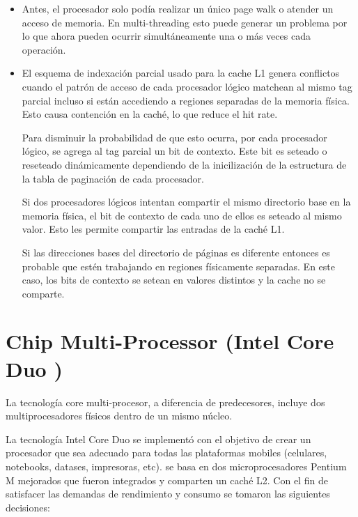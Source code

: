 \begin{itemize}
	\item Antes, el procesador solo podía realizar un único page walk o atender un acceso de memoria. En multi-threading esto puede generar un problema por lo que ahora pueden ocurrir simultáneamente una o más veces cada operación.
	\item El esquema de indexación parcial usado para la cache L1 genera conflictos cuando el patrón de acceso de cada procesador lógico matchean al mismo tag parcial incluso si están accediendo a regiones separadas de la memoria física. Esto causa contención en la caché, lo que reduce el hit rate.
	
	Para disminuir la probabilidad de que esto ocurra, por cada procesador lógico, se agrega al tag parcial un bit de contexto. Este bit es seteado o reseteado dinámicamente dependiendo de la inicilización de la estructura de la tabla de paginación de cada procesador. 
	
	Si dos procesadores lógicos intentan compartir el mismo directorio base en la memoria física, el bit de contexto de cada uno de ellos es seteado al mismo valor. Esto les permite compartir las entradas de la caché L1.
	
	Si las direcciones bases del directorio de páginas es diferente entonces es probable que estén trabajando en regiones físicamente separadas. En este caso, los bits de contexto se setean en valores distintos y la cache no se comparte.
\end{itemize}

\newpage
\section{Chip Multi-Processor (Intel Core Duo \cite{gochman2006ICD})}
La tecnología core multi-procesor, a diferencia de predecesores, incluye dos multiprocesadores físicos dentro de un mismo núcleo. 

La tecnología Intel Core Duo se implementó con el objetivo de crear un procesador que sea adecuado para todas las plataformas mobiles (celulares, notebooks, datases, impresoras, etc). se basa en dos microprocesadores Pentium M mejorados que fueron integrados y comparten un caché L2. Con el fin de satisfacer las demandas de rendimiento y consumo se tomaron las siguientes decisiones:


